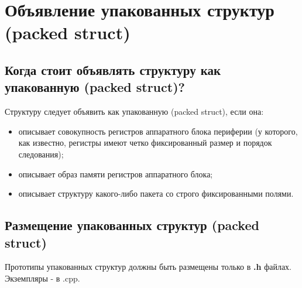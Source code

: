 \chapter{Объявление упакованных структур (packed struct)}\label{struct:p}
\section{Когда стоит объявлять структуру как упакованную (packed struct)?}
Структуру следует объявить как упакованную (packed struct), если она:
\begin{itemize}
	\item описывает совокупность регистров аппаратного блока периферии (у которого, как известно, регистры имеют четко фиксированный размер и порядок следования);
	\item описывает образ памяти регистров аппаратного блока;
	\item описывает структуру какого-либо пакета со строго фиксированными полями.
\end{itemize}

\section{Размещение упакованных структур (packed struct)}
Прототипы упакованных структур должны быть размещены только в \textbf{.h} файлах. Экземпляры - в .cpp.

